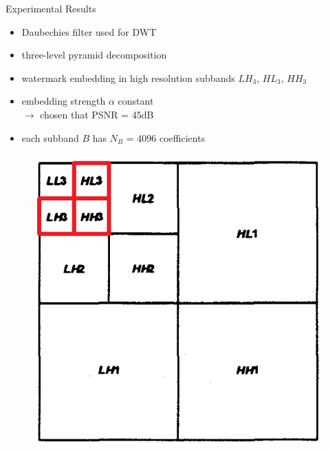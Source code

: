 \begin{frame}{Experimental Results}
	\begin{minipage}{0.54\textwidth}
	\begin{itemize}
	\item Daubechies filter used for DWT
	\item three-level pyramid decomposition
	\item watermark embedding in high resolution subbands $LH_3$, $HL_3$, $HH_3$ 
	\item embedding strength $\alpha$ constant \\ $\rightarrow$ chosen that PSNR = 45dB
	\item each subband $B$ has $N_B$ = 4096 coefficients%
	\end{itemize}
	\end{minipage} 
	\begin{minipage}{0.44\textwidth}
	\begin{figure}
	\centering
	\includegraphics[width=\textwidth]{Bilder/threelayerMotivationPainted} 
	\end{figure}
	\end{minipage} 	
\end{frame}

